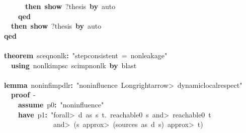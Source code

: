 \documentclass{article}
\newcommand{\syntaxKEYWORDA}[1]{\textcolor[rgb]{0.0,0.4,0.6}{\textbf{#1}}}
\newcommand{\syntaxKEYWORDC}[1]{\textcolor[rgb]{0.0,0.6,1.0}{\textbf{#1}}}
\newcommand{\syntaxLITERALA}[1]{\textcolor[rgb]{1.0,0.0,0.8}{#1}}
\newcommand{\syntaxOPERATOR}[1]{\textcolor[rgb]{0.0,0.0,0.0}{\textbf{#1}}}
\newcommand{\syntaxKEYWORDA}[1]{\textcolor[rgb]{0.0,0.4,0.6}{\textbf{#1}}}
\newcommand{\syntaxKEYWORDC}[1]{\textcolor[rgb]{0.0,0.6,1.0}{\textbf{#1}}}
\newcommand{\syntaxLITERALA}[1]{\textcolor[rgb]{1.0,0.0,0.8}{#1}}
\newcommand{\syntaxOPERATOR}[1]{\textcolor[rgb]{0.0,0.0,0.0}{\textbf{#1}}}
\newcommand{\syntaxKEYWORDA}[1]{\textcolor[rgb]{0.0,0.4,0.6}{\textbf{#1}}}
\newcommand{\syntaxKEYWORDC}[1]{\textcolor[rgb]{0.0,0.6,1.0}{\textbf{#1}}}
\newcommand{\syntaxLITERALA}[1]{\textcolor[rgb]{1.0,0.0,0.8}{#1}}
\newcommand{\syntaxOPERATOR}[1]{\textcolor[rgb]{0.0,0.0,0.0}{\textbf{#1}}}
\newcommand{\syntaxKEYWORDA}[1]{\textcolor[rgb]{0.0,0.4,0.6}{#1}}
\newcommand{\syntaxKEYWORDC}[1]{\textcolor[rgb]{0.0,0.6,1.0}{#1}}
\newcommand{\syntaxLITERALA}[1]{\textcolor[rgb]{1.0,0.0,0.8}{\textbf{#1}}}
\newcommand{\syntaxOPERATOR}[1]{\textcolor[rgb]{0.0,0.0,0.0}{#1}}
\newcommand{\syntaxKEYWORDA}[1]{\textcolor[rgb]{0.0,0.4,0.6}{\textbf{#1}}}
\newcommand{\syntaxKEYWORDC}[1]{\textcolor[rgb]{0.0,0.6,1.0}{\textbf{#1}}}
\newcommand{\syntaxLITERALA}[1]{\textcolor[rgb]{1.0,0.0,0.8}{#1}}
\newcommand{\syntaxOPERATOR}[1]{\textcolor[rgb]{0.0,0.0,0.0}{\textbf{#1}}}
\newcommand{\syntaxKEYWORDA}[1]{\textcolor[rgb]{0.0,0.4,0.6}{\textbf{#1}}}
\newcommand{\syntaxKEYWORDC}[1]{\textcolor[rgb]{0.0,0.6,1.0}{\textbf{#1}}}
\newcommand{\syntaxLITERALA}[1]{\textcolor[rgb]{1.0,0.0,0.8}{#1}}
\newcommand{\syntaxOPERATOR}[1]{\textcolor[rgb]{0.0,0.0,0.0}{\textbf{#1}}}
\begin{document}
{\ }{\ }{\ }{\ }{\ }{\ }{\ }{\ }{\ }{\ }\syntaxKEYWORDA{then}{\ }\syntaxKEYWORDC{show}{\ }?thesis{\ }\syntaxKEYWORDA{by}{\ }auto\hspace*{\fill}\\
{\ }{\ }{\ }{\ }{\ }{\ }{\ }{\ }\syntaxKEYWORDA{qed}\hspace*{\fill}\\
{\ }{\ }{\ }{\ }{\ }{\ }\syntaxKEYWORDA{then}{\ }\syntaxKEYWORDC{show}{\ }?thesis{\ }\syntaxKEYWORDA{by}{\ }auto\hspace*{\fill}\\
{\ }{\ }{\ }{\ }\syntaxKEYWORDA{qed}\hspace*{\fill}\\
{\ }{\ }{\ }{\ }{\ }{\ }{\ }{\ }{\ }{\ }\hspace*{\fill}\\
{\ }{\ }{\ }{\ }\syntaxKEYWORDA{theorem}{\ }sc\usebox{\underscorebox}eq\usebox{\underscorebox}nonlk\syntaxOPERATOR{:}{\ }\syntaxLITERALA{"step\usebox{\underscorebox}consistent{\ }={\ }nonleakage"}{\ }\hspace*{\fill}\\
{\ }{\ }{\ }{\ }{\ }{\ }\syntaxKEYWORDA{using}{\ }nonlk\usebox{\underscorebox}imp\usebox{\underscorebox}sc{\ }sc\usebox{\underscorebox}imp\usebox{\underscorebox}nonlk{\ }\syntaxKEYWORDA{by}{\ }blast\hspace*{\fill}\\
{\ }{\ }{\ }{\ }\hspace*{\fill}\\
{\ }{\ }{\ }{\ }\syntaxKEYWORDA{lemma}{\ }noninf\usebox{\underscorebox}imp\usebox{\underscorebox}dlr\syntaxOPERATOR{:}{\ }\syntaxLITERALA{"noninfluence{\ }\<Longrightarrow>{\ }dynamic\usebox{\underscorebox}local\usebox{\underscorebox}respect"}\hspace*{\fill}\\
{\ }{\ }{\ }{\ }{\ }{\ }\syntaxKEYWORDA{proof}{\ }{-}\hspace*{\fill}\\
{\ }{\ }{\ }{\ }{\ }{\ }{\ }{\ }\syntaxKEYWORDC{assume}{\ }p0\syntaxOPERATOR{:}{\ }\syntaxLITERALA{"noninfluence"}\hspace*{\fill}\\
{\ }{\ }{\ }{\ }{\ }{\ }{\ }{\ }\syntaxKEYWORDA{have}{\ }p1\syntaxOPERATOR{:}{\ }\syntaxLITERALA{"\<forall>{\ }d{\ }as{\ }s{\ }t.{\ }reachable0{\ }s{\ }\<and>{\ }reachable0{\ }t}\hspace*{\fill}\\
\syntaxLITERALA{{\ }{\ }{\ }{\ }{\ }{\ }{\ }{\ }{\ }{\ }{\ }{\ }{\ }{\ }{\ }{\ }{\ }{\ }\<and>{\ }(s{\ }\<approx>{\ }(sources{\ }as{\ }d{\ }s){\ }\<approx>{\ }t)}\hspace*{\fill}\\
\end{document}
